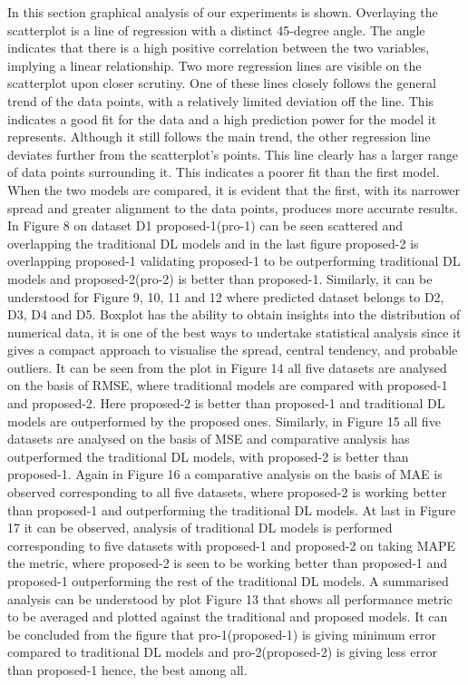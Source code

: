 In this section graphical analysis of our experiments is shown. Overlaying the scatterplot is a line of regression with a distinct 45-degree angle. The angle indicates that there is a high positive correlation between the two variables,  implying a linear relationship. Two more regression lines are visible on the scatterplot upon closer scrutiny. One of these lines closely follows the general trend of the data points,  with a relatively limited deviation off the line. This indicates a good fit for the data and a high prediction power for the model it represents. Although it still follows the main trend,  the other regression line deviates further from the scatterplot's points. This line clearly has a larger range of data points surrounding it. This indicates a poorer fit than the first model. When the two models are compared,  it is evident that the first,  with its narrower spread and greater alignment to the data points,  produces more accurate results. In Figure 8 on dataset D1 proposed-1(pro-1) can be seen scattered and overlapping the traditional DL models and in the last figure proposed-2 is overlapping proposed-1 validating proposed-1 to be outperforming traditional DL models and proposed-2(pro-2) is better than proposed-1. Similarly,  it can be understood for Figure 9,  10,  11 and 12 where predicted dataset belongs to D2,  D3,  D4 and D5. Boxplot has the ability to obtain insights into the distribution of numerical data,  it is one of the best ways to undertake statistical analysis since it gives a compact approach to visualise the spread,  central tendency,  and probable outliers. It can be seen from the plot in Figure 14 all five datasets are analysed on the basis of RMSE,  where traditional models are compared with proposed-1 and proposed-2. Here proposed-2 is better than proposed-1 and traditional DL models are outperformed by the proposed ones. Similarly,  in Figure 15 all five datasets are analysed on the basis of MSE and comparative analysis has outperformed the traditional DL models,  with proposed-2 is better than proposed-1. Again in Figure 16 a comparative analysis on the basis of MAE is observed corresponding to all five datasets,  where proposed-2 is working better than proposed-1 and outperforming the traditional DL models. At last in Figure 17 it can be observed,  analysis of traditional DL models is performed corresponding to five datasets with proposed-1 and proposed-2 on taking MAPE the metric,  where proposed-2 is seen to be working better than proposed-1 and proposed-1 outperforming the rest of the traditional DL models. A summarised analysis can be understood by plot Figure 13 that shows all performance metric to be averaged and plotted against the traditional and proposed models. It can be concluded from the figure that pro-1(proposed-1) is giving minimum error compared to traditional DL models and pro-2(proposed-2) is giving less error than proposed-1 hence, the best among all.
 


